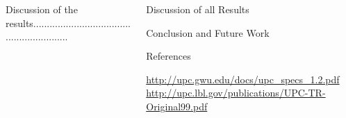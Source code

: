 \documentclass[final]{beamer}
\begin{document}
\begin{frame}[t]
\begin{columns}[t]
\begin{column}{0.60\paperwidth}
\begin{columns}[t,totalwidth=0.60\paperwidth]
\begin{column}{0.28\paperwidth}
						Discussion of the results...........................................................
					\end{column}
				\end{columns}
			\end{column}
			\begin{column}{0.28\paperwidth}
				\begin{block}{Discussion of all Results}
				\end{block}
				\begin{block}{Conclusion and Future Work}
				\end{block}
				\begin{block}{References}
					\begin{thebibliography}{7}
						{\small
							\url{http://upc.gwu.edu/docs/upc_specs_1.2.pdf}
							  \url{http://upc.lbl.gov/publications/UPC-TR-Original99.pdf}
						}
					\end{thebibliography}
				\end{block}
			\end{column}
		\end{columns}
	\end{frame}
\end{document}
